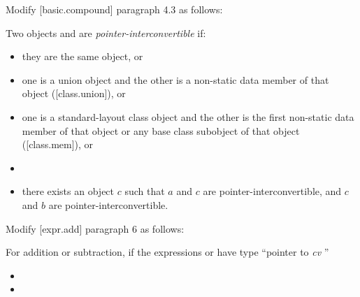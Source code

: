 Modify [basic.compound] paragraph 4.3 as follows:

\begin{adjustwidth}{0.5cm}{0.5cm}
Two objects  and  are \emph{pointer-interconvertible} if:

\begin{itemize}
  \item they are the same object, or
  \item one is a union object and the other is a non-static data member of that object ([class.union]), or
  \item one is a standard-layout class object and the other is the first non-static data member of that object or any base class subobject of that object ([class.mem]), or
  \item {}
  \item there exists an object $c$ such that $a$ and $c$ are pointer-interconvertible, and $c$ and $b$ are pointer-interconvertible.
\end{itemize}
\end{adjustwidth}


Modify [expr.add] paragraph 6 as follows:

\begin{adjustwidth}{0.5cm}{0.5cm}
For addition or subtraction, if the expressions  or  have type ``pointer to \emph{cv} ''
\begin{itemize}
  \item {}
  \item {}
\end{itemize}
\end{adjustwidth}


